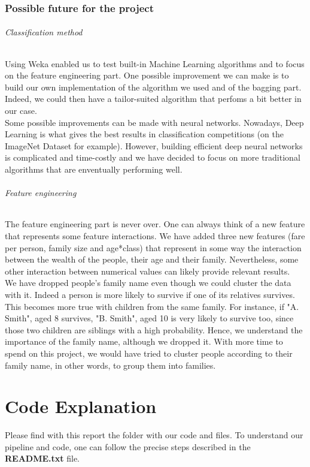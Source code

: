 \documentclass[11pt,a4paper,portrait]{article}
\begin{document}
\section{Possible future for the project}
\paragraph{Classification method}
Using Weka enabled us to test built-in Machine Learning algorithms and to focus on the feature engineering part. One possible improvement we can make is to build our own implementation of the algorithm we used and of the bagging part. Indeed, we could then have a tailor-suited algorithm that perfoms a bit better in our case.\\ Some possible improvements can be made with neural networks. Nowadays, Deep Learning is what gives the best results in classification competitions (on the ImageNet Dataset for example). However, building efficient deep neural networks is complicated and time-costly and we have decided to focus on more traditional algorithms that are enventually performing well.

\paragraph{Feature engineering}
The feature engineering part is never over. One can always think of a new feature that represents some feature interactions. We have added three new features (fare per person, family size and  age*class) that represent in some way the interaction between the wealth of the people, their age and their family. Nevertheless, some other interaction between numerical values can likely provide relevant results.\\
We have dropped people's family name even though we could cluster the data with it. Indeed a person is more likely to survive if one of its relatives survives. This becomes more true with children from the same family. For instance, if "A. Smith", aged 8 survives, "B. Smith", aged 10 is very likely to survive too, since those two children are siblings with a high probability. Hence, we understand the importance of the family name, although we dropped it. With more time to spend on this project, we would have tried to cluster people according to their family name, in other words, to group them into families.

\part*{Code Explanation}
Please find with this report the folder with our code and files. To understand our pipeline and code, one can follow the precise steps described in the \textbf{README.txt} file.
\end{document}
